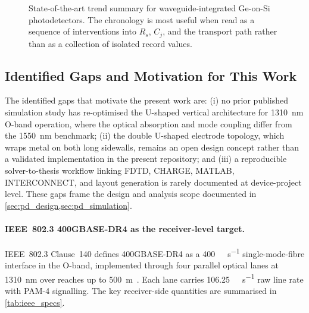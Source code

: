 \begin{figure}[H]
    \centering
    \caption{State-of-the-art trend summary for waveguide-integrated Ge-on-Si
    photodetectors. The chronology is most useful when read as a sequence of
    interventions into $R_s$, $C_j$, and the transport path rather than as a
    collection of isolated record values.}
\label{fig:pd_literature_trends}
\end{figure}

\subsection[Identified Gaps and Motivation]{Identified Gaps and Motivation for This Work}
\label{subsec:pd_gaps}

The identified gaps that motivate the present work are: (i) no prior published
simulation study has re-optimised the U-shaped vertical architecture for
\SI{1310}{\nano\metre} O-band operation, where the optical absorption and mode
coupling differ from the \SI{1550}{\nano\metre} benchmark; (ii) the double
U-shaped electrode topology, which wraps metal on both long sidewalls, remains
an open design concept rather than a validated implementation in the present
repository; and (iii) a reproducible solver-to-thesis workflow linking FDTD,
CHARGE, MATLAB, INTERCONNECT, and layout generation is rarely documented at
device-project level. These gaps frame the design and analysis scope documented
in \cref{sec:pd_design,sec:pd_simulation}.

\paragraph{IEEE~802.3 400GBASE-DR4 as the receiver-level target.}
IEEE~802.3 Clause~140 defines 400GBASE-DR4 as a \SI{400}{\giga\bit\per\second}
single-mode-fibre interface in the O-band, implemented through four parallel
optical lanes at \SI{1310}{\nano\metre} over reaches up to
\SI{500}{\metre}~\cite{IEEE80232022}. Each lane carries \SI{106.25}{\giga\bit\per\second}
raw line rate with PAM-4 signalling. The key receiver-side quantities are
summarised in \cref{tab:ieee_specs}.

